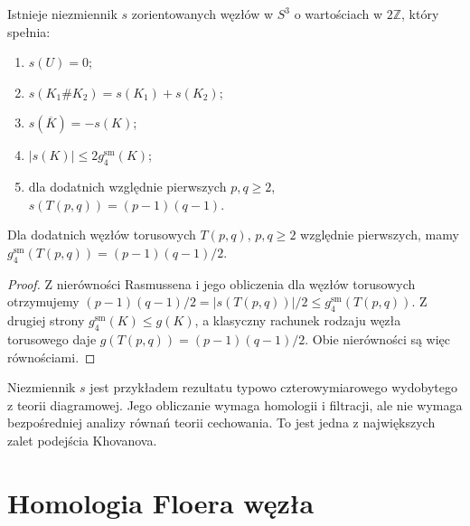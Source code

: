 \begin{twierdzenie}[Rasmussen]
Istnieje niezmiennik $s$ zorientowanych węzłów w $S^3$
o wartościach w $2\mathbb Z$, który spełnia:
\begin{enumerate}[label=(\roman*)]
\item $s(U)=0$;
\item $s(K_1\#K_2)=s(K_1)+s(K_2)$;
\item $s(\overline K)=-s(K)$;
\item $|s(K)|\leq2g_4^{\mathrm{sm}}(K)$;
\item dla dodatnich względnie pierwszych $p,q\geq2$,
$s(T(p,q))=(p-1)(q-1)$.
\end{enumerate}
\end{twierdzenie}

\begin{wniosek}
Dla dodatnich węzłów torusowych $T(p,q)$,
$p,q\geq2$ względnie pierwszych, mamy
$g_4^{\mathrm{sm}}(T(p,q))=(p-1)(q-1)/2$.
\end{wniosek}

\begin{proof}
Z nierówności Rasmussena i jego obliczenia dla węzłów
torusowych otrzymujemy
$(p-1)(q-1)/2=|s(T(p,q))|/2\leq g_4^{\mathrm{sm}}(T(p,q))$.
Z drugiej strony $g_4^{\mathrm{sm}}(K)\leq g(K)$,
a klasyczny rachunek rodzaju węzła torusowego daje
$g(T(p,q))=(p-1)(q-1)/2$. Obie nierówności są więc
równościami.
\end{proof}

\begin{uwaga}
Niezmiennik $s$ jest przykładem rezultatu typowo
czterowymiarowego wydobytego z teorii diagramowej.
Jego obliczanie wymaga homologii i filtracji, ale nie
wymaga bezpośredniej analizy równań teorii cechowania.
To jest jedna z największych zalet podejścia Khovanova.
\end{uwaga}

\section{Homologia Floera węzła}
\label{sec:kt-hfk}


